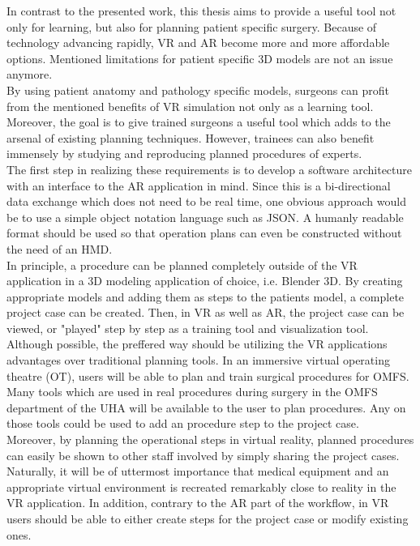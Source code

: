 In contrast to the presented work, this thesis aims to provide a useful tool not only for learning, but also for planning patient specific surgery.
Because of technology advancing rapidly, VR and AR become more and more affordable options.
Mentioned limitations for patient specific 3D models are not an issue anymore.
\\ By using patient anatomy and pathology specific models, surgeons can profit from the mentioned benefits of VR simulation not only as a learning tool.
Moreover, the goal is to give trained surgeons a useful tool which adds to the arsenal of existing planning techniques.
However, trainees can also benefit immensely by studying and reproducing planned procedures of experts.
\\ The first step in realizing these requirements is to develop a software architecture with an interface to the AR application in mind.
Since this is a bi-directional data exchange which does not need to be real time, one obvious approach would be to use a simple object notation language such as JSON.
A humanly readable format should be used so that operation plans can even be constructed without the need of an HMD.
\\ In principle, a procedure can be planned completely outside of the VR application in a 3D modeling application of choice, i.e. Blender 3D.
By creating appropriate models and adding them as steps to the patients model, a complete project case can be created.
Then, in VR as well as AR, the project case can be viewed, or "played" step by step as a training tool and visualization tool.
\\ Although possible, the preffered way should be utilizing the VR applications advantages over traditional planning tools.
In an immersive virtual operating theatre (OT), users will be able to plan and train surgical procedures for OMFS.
Many tools which are used in real procedures during surgery in the OMFS department of the UHA will be available to the user to plan procedures.
Any on those tools could be used to add an procedure step to the project case.
\\ Moreover, by planning the operational steps in virtual reality, planned procedures can easily be shown to other staff involved by simply sharing the project cases.
Naturally, it will be of uttermost importance that medical equipment and an appropriate virtual environment is recreated remarkably close to reality in the VR application.
In addition, contrary to the AR part of the workflow, in VR users should be able to either create steps for the project case or modify existing ones.